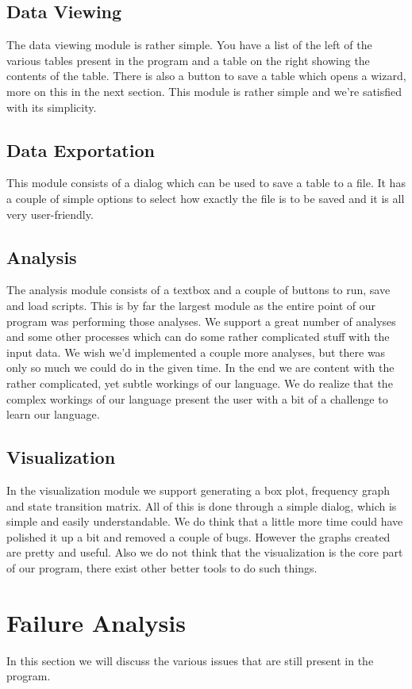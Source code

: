 \subsection{Data Viewing}
The data viewing module is rather simple. You have a list of the left of the various tables present in the program and a table on the right showing the contents of the table. There is also a button to save a table which opens a wizard, more on this in the next section. This module is rather simple and we're satisfied with its simplicity.

\subsection{Data Exportation}
This module consists of a dialog which can be used to save a table to a file. It has a couple of simple options to select how exactly the file is to be saved and it is all very user-friendly.

\subsection{Analysis}
The analysis module consists of a textbox and a couple of buttons to run, save and load scripts. This is by far the largest module as the entire point of our program was performing those analyses. We support a great number of analyses and some other processes which can do some rather complicated stuff with the input data. We wish we'd implemented a couple more analyses, but there was only so much we could do in the given time. In the end we are content with the rather complicated, yet subtle workings of our language. We do realize that the complex workings of our language present the user with a bit of a challenge to learn our language.

\subsection{Visualization}
In the visualization module we support generating a box plot, frequency graph and state transition matrix. All of this is done through a simple dialog, which is simple and easily understandable. We do think that a little more time could have polished it up a bit and removed a couple of bugs. However the graphs created are pretty and useful. Also we do not think that the visualization is the core part of our program, there exist other better tools to do such things.

\section{Failure Analysis}
In this section we will discuss the various issues that are still present in the program.

